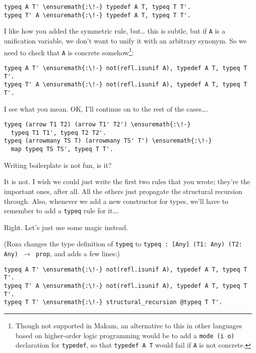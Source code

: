\begin{verbatim}
typeq A T' \ensuremath{:\!-} typedef A T, typeq T T'.
typeq T' A \ensuremath{:\!-} typedef A T, typeq T T'.
\end{verbatim}

\heroADVISOR{} I like how you added the symmetric rule, but\ldots{} this is
subtle, but if \texttt{A} is a unification variable, we don't want to
unify it with an arbitrary synonym. So we need to check that \texttt{A}
is concrete
somehow\footnote{Though not supported in Makam, an alternative to this in other languages based on higher-order logic programming would be to add a \texttt{mode (i o)} declaration for \texttt{typedef}, so that \texttt{typedef A T} would fail if \texttt{A} is not concrete.}:

\begin{verbatim}
typeq A T' \ensuremath{:\!-} not(refl.isunif A), typedef A T, typeq T T'.
typeq T' A \ensuremath{:\!-} not(refl.isunif A), typedef A T, typeq T T'.
\end{verbatim}

\heroSTUDENT{} I see what you mean. OK, I'll continue on to the rest of the
cases\ldots{}.

\begin{verbatim}
typeq (arrow T1 T2) (arrow T1' T2') \ensuremath{:\!-}
  typeq T1 T1', typeq T2 T2'.
typeq (arrowmany TS T) (arrowmany TS' T') \ensuremath{:\!-}
  map typeq TS TS', typeq T T'.
\end{verbatim}

\heroADVISOR{} Writing boilerplate is not fun, is it?

\heroSTUDENT{} It is not. I wish we could just write the first two rules that
you wrote; they're the important ones, after all. All the others just
propagate the structural recursion through. Also, whenever we add a new
constructor for types, we'll have to remember to add a \texttt{typeq}
rule for it\ldots{}.

\heroADVISOR{} Right. Let's just use some magic instead.

\begin{scenecomment}
(Roza changes the type definition of \texttt{typeq} to \texttt{typeq : [Any] (T1: Any) (T2: Any) \ensuremath{\to} prop},
and adds a few lines:)
\end{scenecomment}

\importantCodeblock{}

\begin{verbatim}
typeq A T' \ensuremath{:\!-} not(refl.isunif A), typedef A T, typeq T T'.
typeq T' A \ensuremath{:\!-} not(refl.isunif A), typedef A T, typeq T T'.
typeq T T' \ensuremath{:\!-} structural_recursion @typeq T T'.
\end{verbatim}

